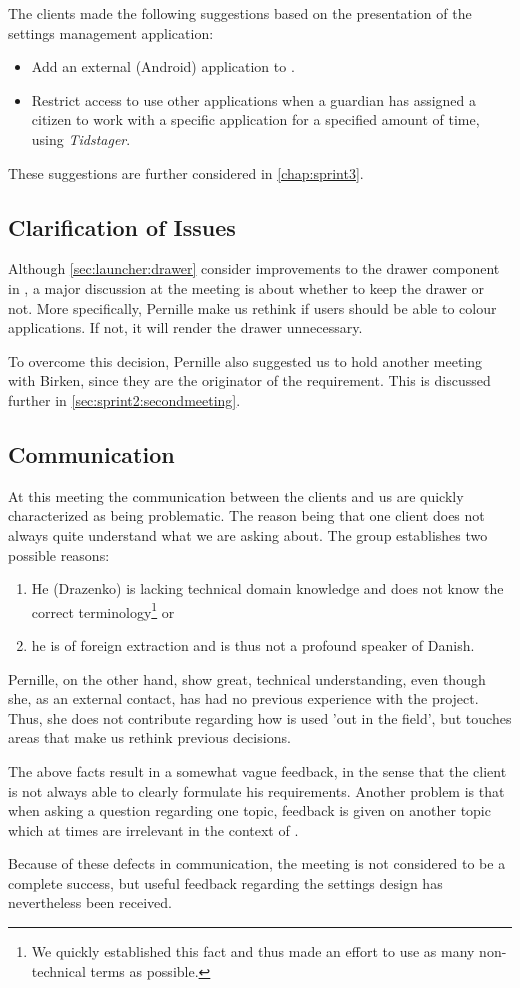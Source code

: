 The clients made the following suggestions based on the presentation of the settings management application:

\begin{itemize}
\item Add an external (Android) application to \launcher.
\item Restrict access to use other applications when a guardian has assigned a citizen to work with a specific application for a specified amount of time, using \textit{Tidstager}.
\end{itemize}

These suggestions are further considered in \cref{chap:sprint3}.

\subsection{Clarification of Issues}
Although \cref{sec:launcher:drawer} consider improvements to the drawer component in \giraf, a major discussion at the meeting is about whether to keep the drawer or not.
More specifically, Pernille make us rethink if users should be able to colour applications.
If not, it will render the drawer unnecessary.

To overcome this decision, Pernille also suggested us to hold another meeting with Birken, since they are the originator of the requirement.
This is discussed further in \cref{sec:sprint2:secondmeeting}.

\subsection{Communication}
At this meeting the communication between the clients and us are quickly characterized as being problematic.
The reason being that one client does not always quite understand what we are asking about.
The group establishes two possible reasons:
\begin{enumerate}
\item He (Drazenko) is lacking technical domain knowledge and does not know the correct terminology\footnote{We quickly established this fact and thus made an effort to use as many non-technical terms as possible.} or
\item he is of foreign extraction and is thus not a profound speaker of Danish.
\end{enumerate}
Pernille, on the other hand, show great, technical understanding, even though she, as an external contact, has had no previous experience with the \giraf project.
Thus, she does not contribute regarding how \giraf is used 'out in the field', but touches areas that make us rethink previous decisions.

The above facts result in a somewhat vague feedback, in the sense that the client is not always able to clearly formulate his requirements.
Another problem is that when asking a question regarding one topic, feedback is given on another topic which at times are irrelevant in the context of \launcher.

Because of these defects in communication, the meeting is not considered to be a complete success, but useful feedback regarding the settings design has nevertheless been received.